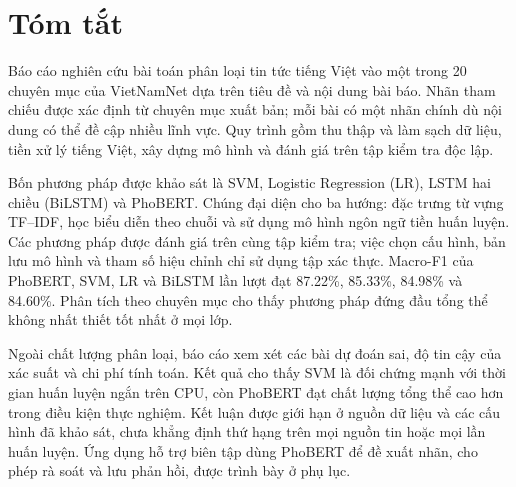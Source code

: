 \chapter*{Tóm tắt}
Báo cáo nghiên cứu bài toán phân loại tin tức tiếng Việt vào một trong 20 chuyên mục của VietNamNet dựa trên tiêu đề và nội dung bài báo. Nhãn tham chiếu được xác định từ chuyên mục xuất bản; mỗi bài có một nhãn chính dù nội dung có thể đề cập nhiều lĩnh vực. Quy trình gồm thu thập và làm sạch dữ liệu, tiền xử lý tiếng Việt, xây dựng mô hình và đánh giá trên tập kiểm tra độc lập.

Bốn phương pháp được khảo sát là SVM, Logistic Regression (LR), LSTM hai chiều (BiLSTM) và PhoBERT. Chúng đại diện cho ba hướng: đặc trưng từ vựng TF--IDF, học biểu diễn theo chuỗi và sử dụng mô hình ngôn ngữ tiền huấn luyện. Các phương pháp được đánh giá trên cùng tập kiểm tra; việc chọn cấu hình, bản lưu mô hình và tham số hiệu chỉnh chỉ sử dụng tập xác thực. Macro-F1 của PhoBERT, SVM, LR và BiLSTM lần lượt đạt 87.22\%, 85.33\%, 84.98\% và 84.60\%. Phân tích theo chuyên mục cho thấy phương pháp đứng đầu tổng thể không nhất thiết tốt nhất ở mọi lớp.

Ngoài chất lượng phân loại, báo cáo xem xét các bài dự đoán sai, độ tin cậy của xác suất và chi phí tính toán. Kết quả cho thấy SVM là đối chứng mạnh với thời gian huấn luyện ngắn trên CPU, còn PhoBERT đạt chất lượng tổng thể cao hơn trong điều kiện thực nghiệm. Kết luận được giới hạn ở nguồn dữ liệu và các cấu hình đã khảo sát, chưa khẳng định thứ hạng trên mọi nguồn tin hoặc mọi lần huấn luyện. Ứng dụng hỗ trợ biên tập dùng PhoBERT để đề xuất nhãn, cho phép rà soát và lưu phản hồi, được trình bày ở phụ lục.

